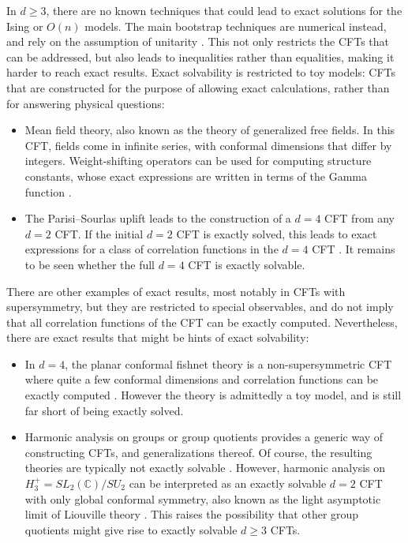 \documentclass[12pt, a4paper]{article}
\begin{document}
In $d\geq 3$, there are no known techniques that could lead to exact solutions for the Ising or $O(n)$ models. The main bootstrap techniques are numerical instead, and rely on the assumption of unitarity \cite{prv18}. This not only restricts the CFTs that can be addressed, but also leads to inequalities rather than equalities, making it harder to reach exact results. 
Exact solvability is restricted to toy models: CFTs that are constructed for the purpose of allowing exact calculations, rather than for answering physical questions: 
\begin{itemize}
 \item Mean field theory, also known as the theory of generalized free fields. In this CFT, fields come in infinite series, with conformal dimensions that differ by integers. Weight-shifting operators can be used for computing structure constants, whose exact expressions are written in terms of the Gamma function \cite{kks18}.
 \item The Parisi--Sourlas uplift leads to the construction of a $d=4$ CFT from any $d=2$ CFT. If the initial $d=2$ CFT is exactly solved, this leads to exact expressions for a class of correlation functions in the $d=4$ CFT \cite{tre24}. It remains to be seen whether the full $d=4$ CFT is exactly solvable.
\end{itemize}
There are other examples of exact results, most notably in CFTs with supersymmetry, but they are restricted to special observables, and do not imply that all correlation functions of the CFT can be exactly computed. Nevertheless, there are exact results that might be hints of exact solvability:
\begin{itemize}
 \item In $d=4$, the planar conformal fishnet theory is a non-supersymmetric CFT where quite a few conformal dimensions and correlation functions can be exactly computed \cite{gkk18}. However the theory is admittedly a toy model, and is still far short of being exactly solved.  
 \item Harmonic analysis on groups or group quotients provides a generic way of constructing CFTs, and generalizations thereof. Of course, the resulting theories are typically not exactly solvable \cite{kmp21}. However, harmonic analysis on $H_3^+=SL_2(\mathbb{C})/SU_2$ can be interpreted as an exactly solvable $d=2$ CFT with only global conformal symmetry, also known as the light asymptotic limit of Liouville theory \cite{rib14}. This raises the possibility that other group quotients might give rise to exactly solvable $d\geq 3$ CFTs. 
\end{itemize}
\end{document}
